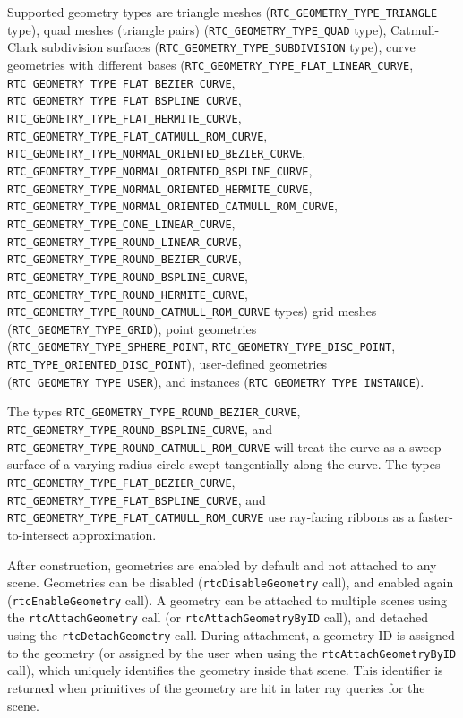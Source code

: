 Supported geometry types are triangle meshes
(\texttt{RTC\_GEOMETRY\_TYPE\_TRIANGLE} type), quad meshes (triangle
pairs) (\texttt{RTC\_GEOMETRY\_TYPE\_QUAD} type), Catmull-Clark
subdivision surfaces (\texttt{RTC\_GEOMETRY\_TYPE\_SUBDIVISION} type),
curve geometries with different bases
(\texttt{RTC\_GEOMETRY\_TYPE\_FLAT\_LINEAR\_CURVE},
\texttt{RTC\_GEOMETRY\_TYPE\_FLAT\_BEZIER\_CURVE},\\
\texttt{RTC\_GEOMETRY\_TYPE\_FLAT\_BSPLINE\_CURVE},
\texttt{RTC\_GEOMETRY\_TYPE\_FLAT\_HERMITE\_CURVE},\\
\texttt{RTC\_GEOMETRY\_TYPE\_FLAT\_CATMULL\_ROM\_CURVE},
\texttt{RTC\_GEOMETRY\_TYPE\_NORMAL\_ORIENTED\_BEZIER\_CURVE},
\texttt{RTC\_GEOMETRY\_TYPE\_NORMAL\_ORIENTED\_BSPLINE\_CURVE},
\texttt{RTC\_GEOMETRY\_TYPE\_NORMAL\_ORIENTED\_HERMITE\_CURVE},
\texttt{RTC\_GEOMETRY\_TYPE\_NORMAL\_ORIENTED\_CATMULL\_ROM\_CURVE},
\texttt{RTC\_GEOMETRY\_TYPE\_CONE\_LINEAR\_CURVE},
\texttt{RTC\_GEOMETRY\_TYPE\_ROUND\_LINEAR\_CURVE},
\texttt{RTC\_GEOMETRY\_TYPE\_ROUND\_BEZIER\_CURVE},
\texttt{RTC\_GEOMETRY\_TYPE\_ROUND\_BSPLINE\_CURVE},
\texttt{RTC\_GEOMETRY\_TYPE\_ROUND\_HERMITE\_CURVE},
\texttt{RTC\_GEOMETRY\_TYPE\_ROUND\_CATMULL\_ROM\_CURVE} types) grid
meshes (\texttt{RTC\_GEOMETRY\_TYPE\_GRID}), point geometries
(\texttt{RTC\_GEOMETRY\_TYPE\_SPHERE\_POINT},
\texttt{RTC\_GEOMETRY\_TYPE\_DISC\_POINT},
\texttt{RTC\_TYPE\_ORIENTED\_DISC\_POINT}), user-defined geometries
(\texttt{RTC\_GEOMETRY\_TYPE\_USER}), and instances
(\texttt{RTC\_GEOMETRY\_TYPE\_INSTANCE}).

The types \texttt{RTC\_GEOMETRY\_TYPE\_ROUND\_BEZIER\_CURVE},
\texttt{RTC\_GEOMETRY\_TYPE\_ROUND\_BSPLINE\_CURVE}, and
\texttt{RTC\_GEOMETRY\_TYPE\_ROUND\_CATMULL\_ROM\_CURVE} will treat the
curve as a sweep surface of a varying-radius circle swept tangentially
along the curve. The types
\texttt{RTC\_GEOMETRY\_TYPE\_FLAT\_BEZIER\_CURVE},
\texttt{RTC\_GEOMETRY\_TYPE\_FLAT\_BSPLINE\_CURVE}, and
\texttt{RTC\_GEOMETRY\_TYPE\_FLAT\_CATMULL\_ROM\_CURVE} use ray-facing
ribbons as a faster-to-intersect approximation.

After construction, geometries are enabled by default and not attached
to any scene. Geometries can be disabled (\texttt{rtcDisableGeometry}
call), and enabled again (\texttt{rtcEnableGeometry} call). A geometry
can be attached to multiple scenes using the \texttt{rtcAttachGeometry}
call (or \texttt{rtcAttachGeometryByID} call), and detached using the
\texttt{rtcDetachGeometry} call. During attachment, a geometry ID is
assigned to the geometry (or assigned by the user when using the
\texttt{rtcAttachGeometryByID} call), which uniquely identifies the
geometry inside that scene. This identifier is returned when primitives
of the geometry are hit in later ray queries for the scene.

